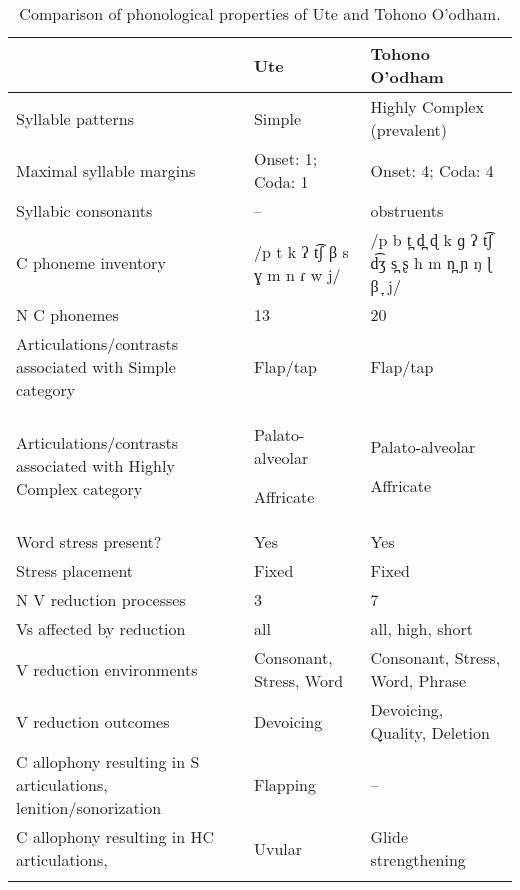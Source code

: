 \begin{table}
\small
\begin{tabularx}{\textwidth}{III}
\lsptoprule
 & {Ute} & {Tohono O’odham}\\
 \midrule
 {Syllable patterns} & Simple & Highly Complex (prevalent)\\
 \tablevspace 
 {Maximal syllable margins} & Onset: 1; Coda: 1 & Onset: 4; Coda: 4\\
 \tablevspace 
 {Syllabic consonants} & -- & obstruents\\
 \tablevspace 
 {C phoneme inventory} & /p t k ʔ t͡ʃ β s ɣ m n ɾ w j/ & /p b t̪ d̪ ɖ k ɡ ʔ t͡ʃ d͡ʒ s̪ ʂ h m n̪ ɲ ŋ ɭ β ̞ j/\\
 \tablevspace 
 {N C phonemes} & 13 & 20\\
 \tablevspace 
 {Articulations/contrasts associated with {Simple}} {category} & {Flap/tap} & {Flap/tap}\\
 \tablevspace 
 {Articulations/contrasts associated with {Highly Complex}} {category} & { {Palato-alveolar}} 
 
 Affricate& { {Palato-alveolar}}
 
 Affricate\\
 \tablevspace 
 {Word stress present?} & {Yes} & {Yes}\\
 \tablevspace 
 {Stress placement} & {Fixed} & {Fixed}\\
 \tablevspace 
 {N V reduction processes} & {3} & {7}\\
 \tablevspace 
 {Vs affected by reduction}  & {all} & {all, high, short}\\
 \tablevspace 
 {V reduction environments} & {Consonant, Stress, Word} & {Consonant, Stress, Word, Phrase}\\
 \tablevspace 
 {V reduction outcomes} & {Devoicing} & {Devoicing, Quality, Deletion}\\
 \tablevspace 
 {C allophony resulting in S articulations, lenition/sonorization} & {{Flapping}} & {--}\\
\tablevspace 
 {{C allophony resulting in HC articulations,} } & {{Uvular}} & {Glide strengthening}\\
\lspbottomrule
\end{tabularx}
\caption{\label{tab:8.2}Comparison of phonological properties of Ute and Tohono O’odham.}
\end{table}

